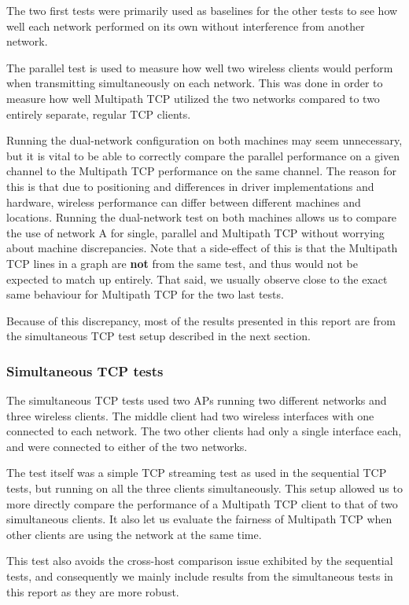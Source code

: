 The two first tests were primarily used as baselines for the other tests to see
how well each network performed on its own without interference from another
network.

The parallel test is used to measure how well two wireless clients would perform when transmitting simultaneously on each network. This was done in
order to measure how well Multipath TCP utilized the two networks compared to
two entirely separate, regular TCP clients.

Running the dual-network configuration on both machines may seem unnecessary,
but it is vital to be able to correctly compare the parallel performance on a
given channel to the Multipath TCP performance on the same channel. The reason
for this is that due to positioning and differences in driver implementations and hardware, wireless
performance can differ between different machines and locations. Running the dual-network test on
both machines allows us to compare the use of network A for
single, parallel and Multipath TCP without
worrying about machine discrepancies. Note that a side-effect of this is that
the Multipath TCP lines in a graph are \textbf{not} from the same test, and thus
would not be expected to match up entirely. That said, we usually observe close
to the exact same behaviour for Multipath TCP for the two last tests.

Because of this discrepancy, most of the results presented in this report are
from the simultaneous TCP test setup described in the next section.

\subsubsection{Simultaneous TCP tests}
\label{sec:met:setups:simtcp}
The simultaneous TCP tests used two APs running two different networks and three wireless
clients. The middle client had two wireless interfaces with one connected to
each network. The two other clients had only a single interface each, and were
connected to either of the two networks.

The test itself was a simple TCP streaming test as used in the sequential TCP
tests, but running on all the three clients simultaneously. This setup allowed
us to more directly compare the performance of a Multipath TCP client to that of
two simultaneous clients. It also let us evaluate the fairness of Multipath TCP
when other clients are using the network at the same time.

This test also avoids the cross-host comparison issue exhibited by the
sequential tests, and consequently we mainly include results from the
simultaneous tests in this report as they are more robust.

